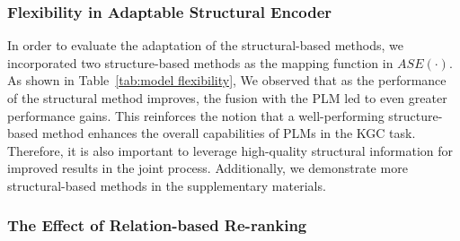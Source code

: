 \documentclass[11pt]{article}
\begin{document}
\begin{table}[!htbp]
	\centering
        \caption{
        Results on FB15k-237 with three map functions for the structural encoder. $\checkmark$ means unifying PLM for training, while $\times$ means only using the structural encoder for training. $\odot$ denotes the Hadamard product.
        }
        \vspace{-10pt}
        \label{tab:model flexibility} 
\end{table}

\subsubsection{Flexibility in Adaptable Structural Encoder}

In order to evaluate the adaptation of the structural-based methods, we incorporated two structure-based methods as the mapping function in $ASE(\cdot)$. As shown in Table~\ref{tab:model flexibility}, We observed that as the performance of the structural method improves, the fusion with the PLM led to even greater performance gains. This reinforces the notion that a well-performing structure-based method enhances the overall capabilities of PLMs in the KGC task. Therefore, it is also important to leverage high-quality structural information for improved results in the joint process. Additionally, we demonstrate more structural-based methods in the supplementary materials.

\subsubsection{The Effect of Relation-based Re-ranking}
\end{document}
